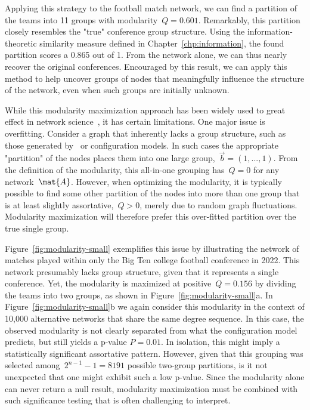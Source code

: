 Applying this strategy to the football match network, we can find a partition of the teams into 11 groups with modularity~$Q = 0.601$. Remarkably, this partition closely resembles the "true" conference group structure. Using the information-theoretic similarity measure defined in Chapter~\ref{chp:information}, the found partition scores a 0.865 out of 1. From the network alone, we can thus nearly recover the original conferences. Encouraged by this result, we can apply this method to help uncover groups of nodes that meaningfully influence the structure of the network, even when such groups are initially unknown. 

While this modularity maximization approach has been widely used to great effect in network science~\cite{Barber07, Boccaletti07, GDC10}, it has certain limitations. One major issue is overfitting. Consider a graph that inherently lacks a group structure, such as those generated by \ER~or configuration models. In such cases the appropriate "partition" of the nodes places them into one large group,~$\vec{b} = (1,...,1)$. From the definition of the modularity, this all-in-one grouping has~$Q = 0$ for any network~$\mat{A}$. However, when optimizing the modularity, it is typically possible to find some other partition of the nodes into more than one group that is at least slightly assortative,~$Q > 0$, merely due to random graph fluctuations. Modularity maximization will therefore prefer this over-fitted partition over the true single group. 

Figure~\ref{fig:modularity-small} exemplifies this issue by illustrating the network of matches played within only the Big Ten college football conference in 2022. This network presumably lacks group structure, given that it represents a single conference. Yet, the modularity is maximized at positive~$Q = 0.156$ by dividing the teams into two groups, as shown in Figure~\ref{fig:modularity-small}a. In Figure~\ref{fig:modularity-small}b we again consider this modularity in the context of 10,000 alternative networks that share the same degree sequence. In this case, the observed modularity is not clearly separated from what the configuration model predicts, but still yields a p-value $P = 0.01$. In isolation, this might imply a statistically significant assortative pattern. However, given that this grouping was selected among~$2^{n - 1} - 1 = 8191$ possible two-group partitions, is it not unexpected that one might exhibit such a low p-value. Since the modularity alone can never return a null result, modularity maximization must be combined with such significance testing that is often challenging to interpret. 

